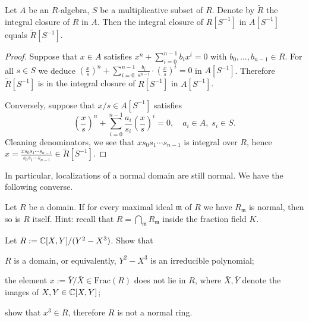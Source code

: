 \begin{lemma}
	Let $A$ be an $R$-algebra, $S$ be a multiplicative subset of $R$. Denote by $\tilde{R}$ the integral closure of $R$ in $A$. Then the integral closure of $R[S^{-1}]$ in $A[S^{-1}]$ equals $\tilde{R}[S^{-1}]$.
\end{lemma}
\begin{proof}
	Suppose that $x \in A$ satisfies $x^n + \sum_{i=0}^{n-1} b_i x^i = 0$ with $b_0, \ldots, b_{n-1} \in R$. For all $s \in S$ we deduce $\left(\frac{x}{s}\right)^n + \sum_{i=0}^{n-1} \frac{b_i}{s^{n-i}} \cdot \left( \frac{x}{s} \right)^i = 0$ in $A[S^{-1}]$. Therefore $\tilde{R}[S^{-1}]$ is in the integral closure of $R[S^{-1}]$ in $A[S^{-1}]$.

	Conversely, suppose that $x/s \in A[S^{-1}]$ satisfies
	\[ \left(\frac{x}{s}\right)^n + \sum_{i=0}^{n-1} \frac{a_i}{s_i} \left( \frac{x}{s} \right)^i = 0, \quad a_i \in A, \; s_i \in S. \]
	Cleaning denominators, we see that $x s_0 s_1 \cdots s_{n-1}$ is integral over $R$, hence $x = \frac{xs_0 s_1 \cdots s_{n-1}}{s_0 s_1 \cdots s_{n-1}} \in \tilde{R}[S^{-1}]$.
\end{proof}

In particular, localizations of a normal domain are still normal. We have the following converse.
\begin{exercise}
	Let $R$ be a domain. If for every maximal ideal $\mathfrak{m}$ of $R$ we have $R_{\mathfrak{m}}$ is normal, then so is $R$ itself. Hint: recall that $R = \bigcap_{\mathfrak{m}} R_{\mathfrak{m}}$ inside the fraction field $K$.
\end{exercise}

\begin{exercise}
	Let $R := \mathbb{C}[X,Y]/(Y^2-X^3)$. Show that
	\begin{compactenum}[(i)]
		\item $R$ is a domain, or equivalently, $Y^2 - X^3$ is an irreducible polynomial;
		\item the element $x := \bar{Y}/\bar{X} \in \text{Frac}(R)$ does not lie in $R$, where $\bar{X},\bar{Y}$ denote the images of $X,Y \in \mathbb{C}[X,Y]$;
		\item show that $x^3 \in R$, therefore $R$ is not a normal ring.
	\end{compactenum}
\end{exercise}

